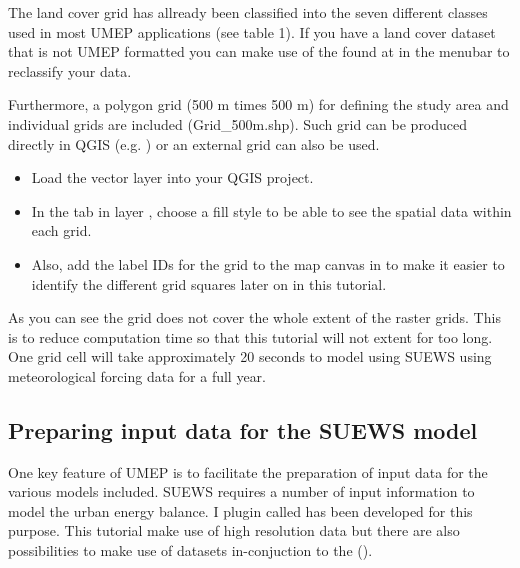 \documentclass[letterpaper,10pt,english]{sphinxmanual}
\begin{document}
The land cover grid has allready been classified into the seven different classes used in most UMEP applications (see table 1). If you have a land cover dataset that is not UMEP formatted you can make use of the  found at  in the menubar to reclassify your data.

Furthermore, a polygon grid (500 m times 500 m) for defining the study area and individual grids are included (Grid\_500m.shp). Such grid can be produced directly in QGIS (e.g. ) or an external grid can also be used.
\begin{itemize}
\item {} 
Load the vector layer  into your QGIS project.

\item {} 
In the  tab in layer , choose a  fill style to be able to see the spatial data within each grid.

\item {} 
Also, add the label IDs for the grid to the map canvas in  to make it easier to identify the different grid squares later on in this tutorial.

\end{itemize}

As you can see the grid does not cover the whole extent of the raster grids. This is to reduce computation time so that this tutorial will not extent for too long. One grid cell will take approximately 20 seconds to model using SUEWS using meteorological forcing data for a full year.


\subsection{Preparing input data for the SUEWS model}
\label{\detokenize{Tutorials/SuewsWUDAPT:preparing-input-data-for-the-suews-model}}

One key feature of UMEP is to facilitate the preparation of input data for the various models included. SUEWS requires a number of input information to model the urban energy balance. I plugin called  has been developed for this purpose. This tutorial make use of high resolution data but there are also possibilities to make use of  datasets in-conjuction to the  ().
\end{document}
